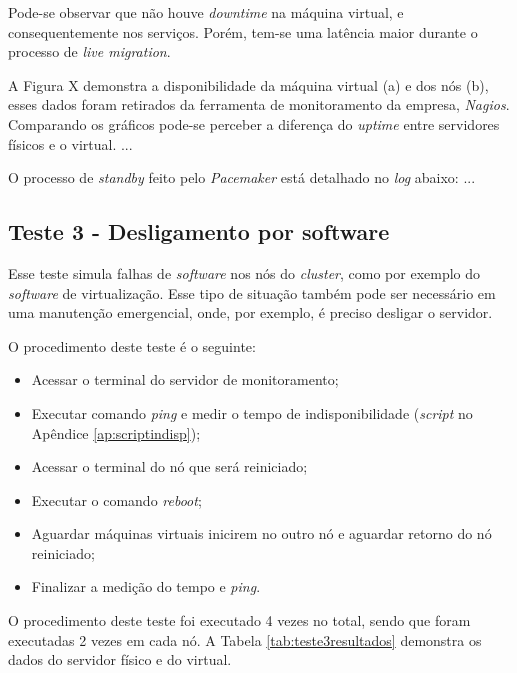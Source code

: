 Pode-se observar que não houve \textit{downtime} na máquina virtual, e consequentemente nos serviços.
Porém, tem-se uma latência maior durante o processo de \textit{live migration}.

A Figura X demonstra a disponibilidade da máquina virtual (a) e dos nós (b), esses dados foram retirados da ferramenta de monitoramento da empresa,
\textit{Nagios}. Comparando os gráficos pode-se perceber a diferença do \textit{uptime} entre servidores físicos e o virtual.
...

O processo de \textit{standby} feito pelo \textit{Pacemaker} está detalhado no \textit{log} abaixo:
...

\subsection{Teste 3 - Desligamento por software}

Esse teste simula falhas de \textit{software} nos nós do \textit{cluster}, como por exemplo do \textit{software} de virtualização. Esse tipo de 
situação também pode ser necessário em uma manutenção emergencial, onde, por exemplo, é preciso desligar o servidor.

O procedimento deste teste é o seguinte:
\begin{itemize}
 \item Acessar o terminal do servidor de monitoramento;
 \item Executar comando \textit{ping} e medir o tempo de indisponibilidade (\textit{script} no Apêndice \ref{ap:scriptindisp});
 \item Acessar o terminal do nó que será reiniciado;
 \item Executar o comando \textit{reboot};
 \item Aguardar máquinas virtuais inicirem no outro nó e aguardar retorno do nó reiniciado;
 \item Finalizar a medição do tempo e \textit{ping}.
\end{itemize}

O procedimento deste teste foi executado 4 vezes no total, sendo que foram executadas 2 vezes em cada nó. A Tabela \ref{tab:teste3resultados}
demonstra os dados do servidor físico e do virtual.

